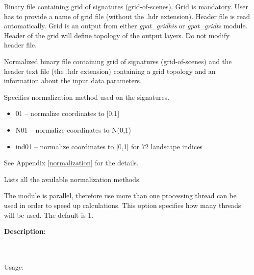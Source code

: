 
Binary file containing grid of signatures (grid-of-scenes). 
Grid is mandatory. 
User has to provide a name of grid file (without the .hdr extension). 
Header file is read automatically. 
Grid is an output from either {\it gpat\_gridhis} or {\it gpat\_gridts} module. 
Header of the grid will define topology of the output layers. 
Do not modify header file.


Normalized binary file containing grid of signatures (grid-of-scenes) and the header text file (the .hdr extension) containing a grid topology and an information about the input data parameters.


Specifies normalization method used on the signatures. 

\begin{itemize}
	\item 01 -- normalize coordinates to [0,1]
	\item N01 -- normalize coordinates to N(0,1)
	\item ind01 -- normalize coordinates to [0,1] for 72 landscape indices
\end{itemize}

See Appendix \ref{normalization} for the details.


Lists all the available normalization methods.


The module is parallel, therefore use more than one processing thread can be used in order to speed up calculations. 
This option specifies how many threads will be used. 
The default is 1.

{\bf Description:}

{}
\\\\
Usage:

